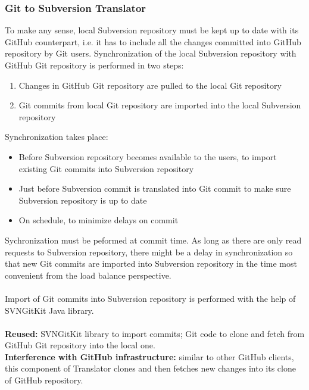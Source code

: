 \subsubsection{Git to Subversion Translator}
To make any sense, local Subversion repository must be kept up to date with its GitHub counterpart, i.e. it has to include all the changes committed into GitHub repository by Git users. Synchronization of the local Subversion repository with GitHub Git repository is performed in two steps:
\begin{enumerate}
\compactlist
\item Changes in GitHub Git repository are pulled to the local Git repository
\item Git commits from local Git repository are imported into the local Subversion repository
\end{enumerate} 
Synchronization takes place:
\begin{itemize}
\item Before Subversion repository becomes available to the users, to import existing Git commits into Subversion repository
\item Just before Subversion commit is translated into Git commit to make sure Subversion repository is up to date
\item On schedule, to minimize delays on commit
\end{itemize}
Sychronization must be peformed at commit time. As long as there are only read requests 
to Subversion repository, there might be a delay in synchronization so that new Git
commits are imported into Subversion repository in the time most convenient from the 
load balance perspective.
\\\\
Import of Git commits into Subversion repository is performed with the help of SVNGitKit Java library.
\\\\
\textbf{Reused:} SVNGitKit library to import commits; Git code to clone and fetch from GitHub Git repository into the local one.\\
\textbf{Interference with GitHub infrastructure:} similar to other GitHub clients, this component of Translator clones and then fetches new changes into its clone of GitHub repository.

